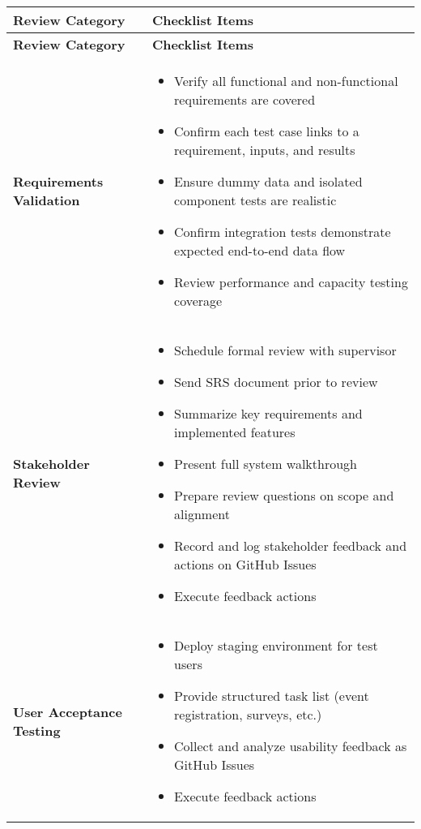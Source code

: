\documentclass[12pt, titlepage]{article}
\begin{document}
\begin{longtable}{|p{4cm}|p{11cm}|}
\hline
\textbf{Review Category} & \textbf{Checklist Items} \\
\hline
\endfirsthead

\hline
\textbf{Review Category} & \textbf{Checklist Items} \\
\hline
\endhead

\textbf{Requirements Validation} &
\begin{itemize}
  \item Verify all functional and non-functional requirements are covered
  \item Confirm each test case links to a requirement, inputs, and results
  \item Ensure dummy data and isolated component tests are realistic
  \item Confirm integration tests demonstrate expected end-to-end data flow
  \item Review performance and capacity testing coverage
\end{itemize}
\\
\hline

\textbf{Stakeholder Review} &
\begin{itemize}
  \item Schedule formal review with supervisor
  \item Send SRS document prior to review
  \item Summarize key requirements and implemented features
  \item Present full system walkthrough
  \item Prepare review questions on scope and alignment
  \item Record and log stakeholder feedback and actions on GitHub Issues
  \item Execute feedback actions
\end{itemize}
\\
\hline

\textbf{User Acceptance Testing} &
\begin{itemize}
  \item Deploy staging environment for test users
  \item Provide structured task list (event registration, surveys, etc.)
  \item Collect and analyze usability feedback as GitHub Issues
  \item Execute feedback actions
\end{itemize}
\\
\hline


\end{longtable}
\end{document}
